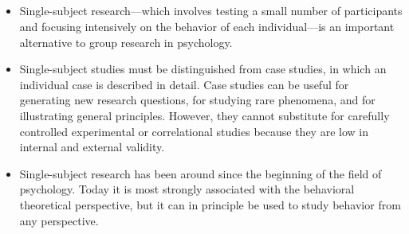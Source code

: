 \subsection{}

\begin{fullwidth}

\begin{itemize}


\item Single-subject research---which involves testing a small number of participants and focusing intensively on the behavior of each individual---is an important alternative to group research in psychology.

\item Single-subject studies must be distinguished from case studies, in which an individual case is described in detail. Case studies can be useful for generating new research questions, for studying rare phenomena, and for illustrating general principles. However, they cannot substitute for carefully controlled experimental or correlational studies because they are low in internal and external validity.

\item Single-subject research has been around since the beginning of the field of psychology. Today it is most strongly associated with the behavioral theoretical perspective, but it can in principle be used to study behavior from any perspective.


\end{itemize}

\end{fullwidth}



\subsection{}

